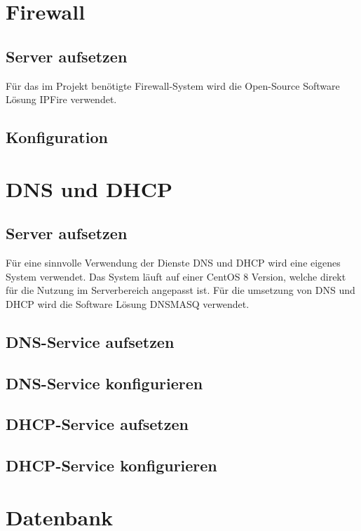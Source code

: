 \documentclass{scrartcl}
\begin{document}
\begin{flushleft}
    \section{Firewall}
    \subsection{Server aufsetzen}
    Für das im Projekt benötigte Firewall-System wird die Open-Source Software Lösung IPFire verwendet. 

    \subsection{Konfiguration}

    \newpage

    \section{DNS und DHCP}
    \subsection{Server aufsetzen}
    Für eine sinnvolle Verwendung der Dienste DNS und DHCP wird eine eigenes System verwendet. Das System läuft auf einer CentOS 8 Version, welche direkt für die Nutzung im Serverbereich angepasst ist. Für die umsetzung von DNS und DHCP wird die Software Lösung DNSMASQ verwendet.
    \subsection{DNS-Service aufsetzen}
    \subsection{DNS-Service konfigurieren}
    \subsection{DHCP-Service aufsetzen}
    \subsection{DHCP-Service konfigurieren}    

    \newpage

    \section{Datenbank}

\end{flushleft}
\end{document}
